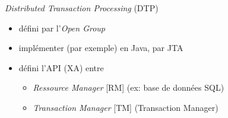 {  \begin{frame}
    \begin{block}{\textit{Distributed Transaction Processing} (DTP)}
      \begin{itemize}
        \item défini par l'\textit{Open Group}
        \item implémenter (par exemple) en Java, par JTA
        \item défini l'API (XA) entre
        \begin{itemize}
          \item \textit{Ressource Manager} [RM] (ex: base de données SQL)
          \item \textit{Transaction Manager} [TM] (Transaction Manager)
        \end{itemize}
      \end{itemize}
    \end{block}
  \end{frame}


}

